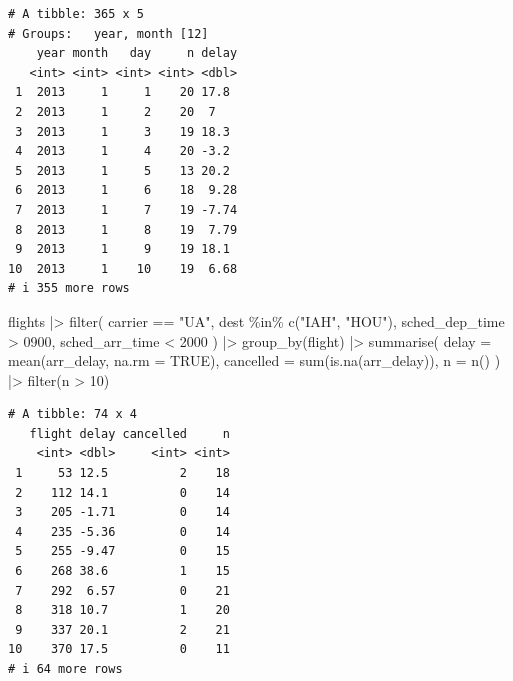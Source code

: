\documentclass[
  letterpaper,
  DIV=11,
  numbers=noendperiod]{scrreprt}
\newenvironment{Shaded}{\begin{snugshade}}{\end{snugshade}}
\newcommand{\AttributeTok}[1]{\textcolor[rgb]{0.40,0.45,0.13}{#1}}
\newcommand{\ConstantTok}[1]{\textcolor[rgb]{0.56,0.35,0.01}{#1}}
\newcommand{\DecValTok}[1]{\textcolor[rgb]{0.68,0.00,0.00}{#1}}
\newcommand{\FunctionTok}[1]{\textcolor[rgb]{0.28,0.35,0.67}{#1}}
\newcommand{\NormalTok}[1]{\textcolor[rgb]{0.00,0.23,0.31}{#1}}
\newcommand{\SpecialCharTok}[1]{\textcolor[rgb]{0.37,0.37,0.37}{#1}}
\newcommand{\StringTok}[1]{\textcolor[rgb]{0.13,0.47,0.30}{#1}}
\begin{document}
\begin{verbatim}
# A tibble: 365 x 5
# Groups:   year, month [12]
    year month   day     n delay
   <int> <int> <int> <int> <dbl>
 1  2013     1     1    20 17.8 
 2  2013     1     2    20  7   
 3  2013     1     3    19 18.3 
 4  2013     1     4    20 -3.2 
 5  2013     1     5    13 20.2 
 6  2013     1     6    18  9.28
 7  2013     1     7    19 -7.74
 8  2013     1     8    19  7.79
 9  2013     1     9    19 18.1 
10  2013     1    10    19  6.68
# i 355 more rows
\end{verbatim}

\begin{Shaded}
\begin{Highlighting}[]
\NormalTok{flights }\SpecialCharTok{|\textgreater{}}
  \FunctionTok{filter}\NormalTok{(}
\NormalTok{    carrier }\SpecialCharTok{==} \StringTok{"UA"}\NormalTok{,}
\NormalTok{    dest }\SpecialCharTok{\%in\%} \FunctionTok{c}\NormalTok{(}\StringTok{"IAH"}\NormalTok{, }\StringTok{"HOU"}\NormalTok{),}
\NormalTok{    sched\_dep\_time }\SpecialCharTok{\textgreater{}} \DecValTok{0900}\NormalTok{,}
\NormalTok{    sched\_arr\_time }\SpecialCharTok{\textless{}} \DecValTok{2000}
\NormalTok{  ) }\SpecialCharTok{|\textgreater{}}
  \FunctionTok{group\_by}\NormalTok{(flight) }\SpecialCharTok{|\textgreater{}}
  \FunctionTok{summarise}\NormalTok{(}
    \AttributeTok{delay =} \FunctionTok{mean}\NormalTok{(arr\_delay, }\AttributeTok{na.rm =} \ConstantTok{TRUE}\NormalTok{),}
    \AttributeTok{cancelled =} \FunctionTok{sum}\NormalTok{(}\FunctionTok{is.na}\NormalTok{(arr\_delay)),}
    \AttributeTok{n =} \FunctionTok{n}\NormalTok{()}
\NormalTok{  ) }\SpecialCharTok{|\textgreater{}}
  \FunctionTok{filter}\NormalTok{(n }\SpecialCharTok{\textgreater{}} \DecValTok{10}\NormalTok{)}
\end{Highlighting}
\end{Shaded}

\begin{verbatim}
# A tibble: 74 x 4
   flight delay cancelled     n
    <int> <dbl>     <int> <int>
 1     53 12.5          2    18
 2    112 14.1          0    14
 3    205 -1.71         0    14
 4    235 -5.36         0    14
 5    255 -9.47         0    15
 6    268 38.6          1    15
 7    292  6.57         0    21
 8    318 10.7          1    20
 9    337 20.1          2    21
10    370 17.5          0    11
# i 64 more rows
\end{verbatim}

\end{document}
